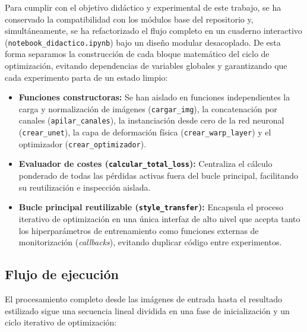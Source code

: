 \documentclass[a4paper]{article}
\begin{document}
\vspace{0.3cm}

\noindent Para cumplir con el objetivo didáctico y experimental de este trabajo, se ha conservado la compatibilidad con los módulos base del repositorio y, simultáneamente, se ha refactorizado el flujo completo en un cuaderno interactivo (\texttt{notebook\_didactico.ipynb}) bajo un diseño modular desacoplado. De esta forma separamos la construcción de cada bloque matemático del ciclo de optimización, evitando dependencias de variables globales y garantizando que cada experimento parta de un estado limpio:

\begin{itemize}
    \item \textbf{Funciones constructoras:} Se han aislado en funciones independientes la carga y normalización de imágenes (\texttt{cargar\_img}), la concatenación por canales (\texttt{apilar\_canales}), la instanciación desde cero de la red neuronal (\texttt{crear\_unet}), la capa de deformación física (\texttt{crear\_warp\_layer}) y el optimizador (\texttt{crear\_optimizador}).
    
    \item \textbf{Evaluador de costes (\texttt{calcular\_total\_loss}):} Centraliza el cálculo ponderado de todas las pérdidas activas fuera del bucle principal, facilitando su reutilización e inspección aislada.
    
    \item \textbf{Bucle principal reutilizable (\texttt{style\_transfer}):} Encapsula el proceso iterativo de optimización en una única interfaz de alto nivel que acepta tanto los hiperparámetros de entrenamiento como funciones externas de monitorización (\textit{callbacks}), evitando duplicar código entre experimentos.
\end{itemize}

\subsection{Flujo de ejecución}

\noindent El procesamiento completo desde las imágenes de entrada hasta el resultado estilizado sigue una secuencia lineal dividida en una fase de inicialización y un ciclo iterativo de optimización:
\end{document}
